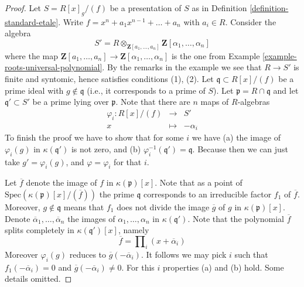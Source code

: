 \begin{proof}
Let $S = R[x]_{g}/(f)$ be a presentation of $S$ as in
Definition \ref{definition-standard-etale}.
Write $f = x^n + a_1 x^{n - 1} + \ldots + a_n$ with $a_i \in R$.
Consider the algebra
$$
S' =
R \otimes_{\mathbf{Z}[a_1, \ldots, a_n]} \mathbf{Z}[\alpha_1, \ldots, \alpha_n]
$$
where the map
$\mathbf{Z}[a_1, \ldots, a_n] \to \mathbf{Z}[\alpha_1, \ldots, \alpha_n]$
is the one from Example \ref{example-roots-universal-polynomial}.
By the remarks in the example we see that $R \to S'$ is finite and
syntomic, hence satisfies conditions (1), (2).
Let $\mathfrak q \subset R[x]/(f)$ be a prime ideal with
$g \not \in \mathfrak q$ (i.e., it corresponds to a prime of $S$).
Let $\mathfrak p = R \cap \mathfrak q$ and let
$\mathfrak q' \subset S'$ be a prime lying over $\mathfrak p$.
Note that there are
$n$ maps of $R$-algebras
\begin{eqnarray*}
\varphi_i : R[x]/(f) & \longrightarrow & S' \\
x & \longmapsto & -\alpha_i
\end{eqnarray*}
To finish the proof we have to show that for some $i$ we have
(a) the image of $\varphi_i(g)$ in $\kappa(\mathfrak q')$ is not zero,
and (b) $\varphi_i^{-1}(\mathfrak q') = \mathfrak q$.
Because then we can just take $g' = \varphi_i(g)$, and
$\varphi = \varphi_i$ for that $i$.

\medskip\noindent
Let $\overline{f}$ denote the image of $f$ in $\kappa(\mathfrak p)[x]$.
Note that as a point of $\text{Spec}(\kappa(\mathfrak p)[x]/(\overline{f}))$
the prime $\mathfrak q$ corresponds to an irreducible factor 
$f_1$ of $\overline{f}$. Moreover, $g \not \in \mathfrak q$ means
that $f_1$ does not divide the image $\overline{g}$ of $g$ in
$\kappa(\mathfrak p)[x]$.
Denote $\overline{\alpha}_1, \ldots, \overline{\alpha}_n$ the images
of $\alpha_1, \ldots, \alpha_n$ in $\kappa(\mathfrak q')$.
Note that the polynomial $\overline{f}$ splits completely
in $\kappa(\mathfrak q')[x]$, namely
$$
\overline{f} = \prod\nolimits_i (x + \overline{\alpha}_i)
$$
Moreover $\varphi_i(g)$ reduces to $\overline{g}(-\overline{\alpha}_i)$.
It follows we may pick $i$ such that $f_1(-\overline{\alpha}_i) = 0$ and
$\overline{g}(-\overline{\alpha}_i) \not = 0$.
For this $i$ properties (a) and (b) hold. Some details omitted.
\end{proof}

